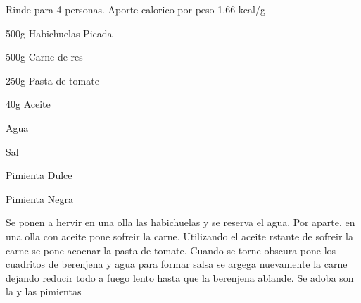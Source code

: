
Rinde para 4 personas. Aporte calorico por peso 1.66 kcal/g

\begin{ingredientes}
\item 500g Habichuelas Picada
\item 500g Carne de res
\item 250g Pasta de tomate
\item 40g Aceite
\item Agua
\item Sal
\item Pimienta Dulce
\item Pimienta Negra
\end{ingredientes}
\preparacion

Se ponen a hervir en una olla las habichuelas y se reserva el agua. Por aparte, en una olla con aceite pone sofreir la carne. Utilizando el aceite rstante de sofreir la carne se pone acocnar la pasta de tomate. Cuando se torne obscura pone los cuadritos de berenjena y agua para formar salsa se argega nuevamente la carne dejando reducir todo a fuego lento hasta que la berenjena ablande. Se adoba son la y las pimientas


